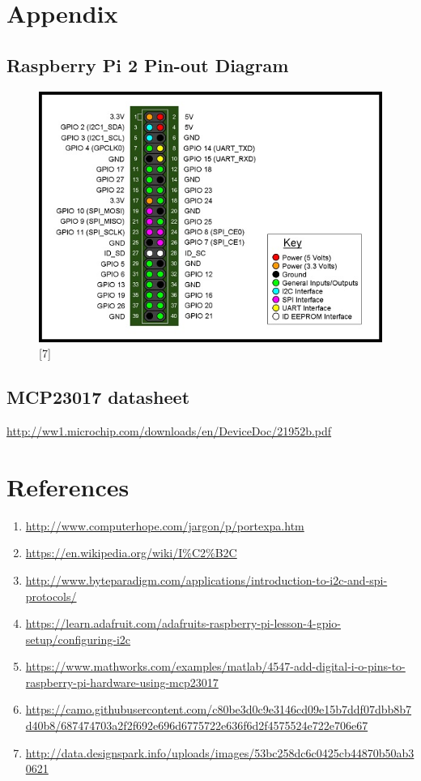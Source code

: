 \documentclass[11pt,a4paper]{article}
\begin{document}
	\newpage

	\section{Appendix}
	\subsection{Raspberry Pi 2 Pin-out Diagram}
	\begin{figure}[h!]
		\includegraphics[scale=0.6]{RaspberryPi2_pinout.jpg}
		\centering
		\caption{[7]}
	\end{figure}
	
	\subsection{MCP23017 datasheet}
	
	\url{http://ww1.microchip.com/downloads/en/DeviceDoc/21952b.pdf}
	
	\newpage
    \section{References}
    \begin{enumerate}
    	\item \url{http://www.computerhope.com/jargon/p/portexpa.htm}
    	\item \url{https://en.wikipedia.org/wiki/I%C2%B2C}
    	\item \url{http://www.byteparadigm.com/applications/introduction-to-i2c-and-spi-protocols/}
    	\item \url{https://learn.adafruit.com/adafruits-raspberry-pi-lesson-4-gpio-setup/configuring-i2c}
    	\item \url{https://www.mathworks.com/examples/matlab/4547-add-digital-i-o-pins-to-raspberry-pi-hardware-using-mcp23017}
    	\item \url{https://camo.githubusercontent.com/c80be3d0c9e3146cd09e15b7ddf07dbb8b7d40b8/687474703a2f2f692e696d6775722e636f6d2f4575524e722e706e67}
    	\item \url{http://data.designspark.info/uploads/images/53bc258dc6c0425cb44870b50ab30621}
    \end{enumerate}
    
\end{document}
